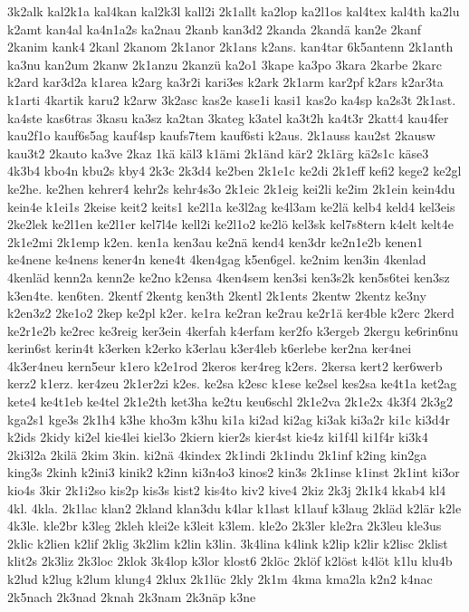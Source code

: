 {3k2alk
kal2k1a
kal4kan
kal2k3l
kall2i
2k1allt
ka2lop
ka2l1os
kal4tex
kal4th
ka2lu
k2amt
kan4al
ka4n1a2s
ka2nau
2kanb
kan3d2
2kanda
2kandä
kan2e
2kanf
2kanim
kank4
2kanl
2kanom
2k1anor
2k1ans
k2ans.
kan4tar
6k5antenn
2k1anth
ka3nu
kan2um
2kanw
2k1anzu
2kanzü
ka2o1
3kape
ka3po
3kara
2karbe
2karc
k2ard
kar3d2a
k1area
k2arg
ka3r2i
kari3es
k2ark
2k1arm
kar2pf
k2ars
k2ar3ta
k1arti
4kartik
karu2
k2arw
3k2asc
kas2e
kase1i
kasi1
kas2o
ka4sp
ka2s3t
2k1ast.
ka4ste
kas6tras
3kasu
ka3sz
ka2tan
3kateg
k3atel
ka3t2h
ka4t3r
2katt4
kau4fer
kau2f1o
kauf6s5ag
kauf4sp
kaufs7tem
kauf6sti
k2aus.
2k1auss
kau2st
2kausw
kau3t2
2kauto
ka3ve
2kaz
1kä
käl3
k1ämi
2k1änd
kär2
2k1ärg
kä2s1c
käse3
4k3b4
kbo4n
kbu2s
kby4
2k3c
2k3d4
ke2ben
2k1e1c
ke2di
2k1eff
kefi2
kege2
ke2gl
ke2he.
ke2hen
kehrer4
kehr2s
kehr4s3o
2k1eic
2k1eig
kei2li
ke2im
2k1ein
kein4du
kein4e
k1ei1s
2keise
keit2
keits1
ke2l1a
ke3l2ag
ke4l3am
ke2lä
kelb4
keld4
kel3eis
2ke2lek
ke2l1en
ke2l1er
kel7l4e
kell2i
ke2l1o2
ke2lö
kel3sk
kel7s8tern
k4elt
kelt4e
2k1e2mi
2k1emp
k2en.
ken1a
ken3au
ke2nä
kend4
ken3dr
ke2n1e2b
kenen1
ke4nene
ke4nens
kener4n
kene4t
4ken4gag
k5en6gel.
ke2nim
ken3in
4kenlad
4kenläd
kenn2a
kenn2e
ke2no
k2ensa
4ken4sem
ken3si
ken3s2k
ken5s6tei
ken3sz
k3en4te.
ken6ten.
2kentf
2kentg
ken3th
2kentl
2k1ents
2kentw
2kentz
ke3ny
k2en3z2
2ke1o2
2kep
ke2pl
k2er.
ke1ra
ke2ran
ke2rau
ke2r1ä
ker4ble
k2erc
2kerd
ke2r1e2b
ke2rec
ke3reig
ker3ein
4kerfah
k4erfam
ker2fo
k3ergeb
2kergu
ke6rin6nu
kerin6st
kerin4t
k3erken
k2erko
k3erlau
k3er4leb
k6erlebe
ker2na
ker4nei
4k3er4neu
kern5eur
k1ero
k2e1rod
2keros
ker4reg
k2ers.
2kersa
kert2
ker6werb
kerz2
k1erz.
ker4zeu
2k1er2zi
k2es.
ke2sa
k2esc
k1ese
ke2sel
kes2sa
ke4t1a
ket2ag
kete4
ke4t1eb
ke4tel
2k1e2th
ket3ha
ke2tu
keu6schl
2k1e2va
2k1e2x
4k3f4
2k3g2
kga2s1
kge3s
2k1h4
k3he
kho3m
k3hu
ki1a
ki2ad
ki2ag
ki3ak
ki3a2r
ki1c
ki3d4r
k2ids
2kidy
ki2el
kie4lei
kiel3o
2kiern
kier2s
kier4st
kie4z
ki1f4l
ki1f4r
ki3k4
2ki3l2a
2kilä
2kim
3kin.
ki2nä
4kindex
2k1indi
2k1indu
2k1inf
k2ing
kin2ga
king3s
2kinh
k2ini3
kinik2
k2inn
ki3n4o3
kinos2
kin3s
2k1inse
k1inst
2k1int
ki3or
kio4s
3kir
2k1i2so
kis2p
kis3s
kist2
kis4to
kiv2
kive4
2kiz
2k3j
2k1k4
kkab4
kl4
4kl.
4kla.
2k1lac
klan2
2kland
klan3du
k4lar
k1last
k1lauf
k3laug
2kläd
k2lär
k2le
4k3le.
kle2br
k3leg
2kleh
klei2e
k3leit
k3lem.
kle2o
2k3ler
kle2ra
2k3leu
kle3us
2klic
k2lien
k2lif
2klig
3k2lim
k2lin
k3lin.
3k4lina
k4link
k2lip
k2lir
k2lisc
2klist
klit2s
2k3liz
2k3loc
2klok
3k4lop
k3lor
klost6
2klöc
2klöf
k2löst
k4löt
k1lu
klu4b
k2lud
k2lug
k2lum
klung4
2klux
2k1lüc
2kly
2k1m
4kma
kma2la
k2n2
k4nac
2k5nach
2k3nad
2knah
2k3nam
2k3näp
k3ne
}
